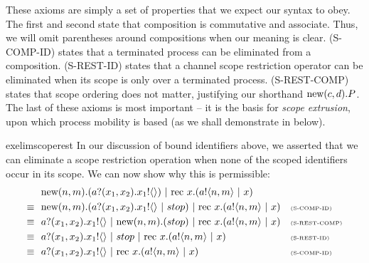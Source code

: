 	These axioms are simply a set of properties that we expect our syntax to obey.  
The first and second state that composition is commutative and associate.  
Thus, we will omit parentheses around compositions when our meaning is clear.  
(S-COMP-ID) states that a terminated process can be eliminated from a composition.  
(S-REST-ID) states that a channel scope restriction operator can be eliminated when its scope is only over a terminated process. (S-REST-COMP) states that scope ordering does not matter, justifying our shorthand $\text{new}({c,d}). P$.  
The last of these axioms is most important -- it is the basis for \emph{scope extrusion}, upon which process mobility is based (as we shall demonstrate in  below).
	
	\begin{example}{exelimscoperest}
		In our discussion of bound identifiers above, we asserted that we can eliminate a scope restriction operation when none of the scoped identifiers occur in its scope. 
		We can now show why this is permissible:
		\begin{align*}
			&\ \text{new}({n,m}).({a}?({x_1,x_2}).{x_1}!\langle{}\rangle)\ |\  \text{rec }{x}.({a}!\langle{n,m}\rangle \ |\  x) &&\\
			\equiv\ &\ \text{new}({n,m}).({a}?({x_1,x_2}).{x_1}!\langle{}\rangle \ |\  stop)\ |\  \text{rec }{x}.({a}!\langle{n,m}\rangle \ |\  x) && \text{\tiny{(S-COMP-ID)}}\\
			\equiv\ &\ {a}?({x_1,x_2}).{x_1}!\langle{}\rangle \ |\  \text{new}({n,m}).(stop)\ |\  \text{rec }{x}.({a}!\langle{n,m}\rangle \ |\  x) && \text{\tiny{(S-REST-COMP)}}\\
			\equiv\ &\ {a}?({x_1,x_2}).{x_1}!\langle{}\rangle \ |\  stop \ |\  \text{rec }{x}.({a}!\langle{n,m}\rangle \ |\  x) && \text{\tiny{(S-REST-ID)}}\\
			\equiv\ &\ {a}?({x_1,x_2}).{x_1}!\langle{}\rangle \ |\  \text{rec }{x}.({a}!\langle{n,m}\rangle \ |\  x) && \text{\tiny{(S-COMP-ID)}}
		\end{align*}
	\end{example}
